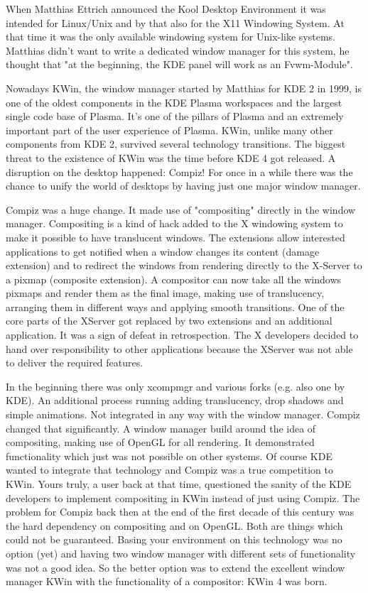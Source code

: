 
\noindent{}When Matthias Ettrich announced the Kool Desktop Environment it was intended for Linux/Unix and by that also for the X11 Windowing System. At that time it was the only available windowing system for Unix-like systems. Matthias didn't want to write a dedicated window manager for this system, he thought that "at the beginning, the KDE panel will work as an Fvwm-Module".

Nowadays KWin, the window manager started by Matthias for KDE 2 in 1999, is one of the oldest components in the KDE Plasma workspaces and the largest single code base of Plasma. It's one of the pillars of Plasma and an extremely important part of the user experience of Plasma. KWin, unlike many other components from KDE 2, survived several technology transitions. The biggest threat to the existence of KWin was the time before KDE 4 got released. A disruption on the desktop happened: Compiz! For once in a while there was the chance to unify the world of desktops by having just one major window manager.

Compiz was a huge change. It made use of "compositing" directly in the window manager. Compositing is a kind of hack added to the X windowing system to make it possible to have translucent windows. The extensions allow interested applications to get notified when a window changes its content (damage extension) and to redirect the windows from rendering directly to the X-Server to a pixmap (composite extension). A compositor can now take all the windows pixmaps and render them as the final image, making use of translucency, arranging them in different ways and applying smooth transitions. One of the core parts of the XServer got replaced by two extensions and an additional application. It was a sign of defeat in retrospection. The X developers decided to hand over responsibility to other applications because the XServer was not able to deliver the required features.

In the beginning there was only xcompmgr and various forks (e.g. also one by KDE). An additional process running adding translucency, drop shadows and simple animations. Not integrated in any way with the window manager. Compiz changed that significantly. A window manager build around the idea of compositing, making use of OpenGL for all rendering. It demonstrated functionality which just was not possible on other systems. Of course KDE wanted to integrate that technology and Compiz was a true competition to KWin. Yours truly, a user back at that time, questioned the sanity of the KDE developers to implement compositing in KWin instead of just using Compiz. The problem for Compiz back then at the end of the first decade of this century was the hard dependency on compositing and on OpenGL. Both are things which could not be guaranteed. Basing your environment on this technology was no option (yet) and having two window manager with different sets of functionality was not a good idea. So the better option was to extend the excellent window manager KWin with the functionality of a compositor: KWin 4 was born.

